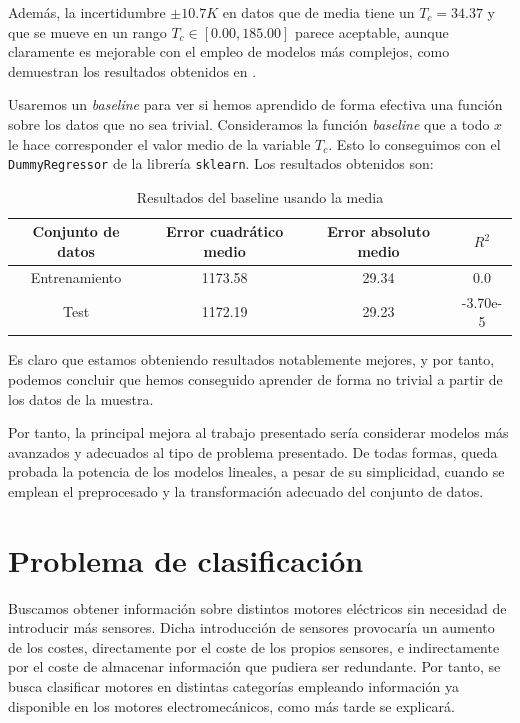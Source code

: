 \documentclass[11pt]{article}
\begin{document}
Además, la incertidumbre $\pm 10.7 K$ en datos que de media tiene un $T_c = 34.37$ y que se mueve en un rango $T_c \in [0.00, 185.00]$ parece aceptable, aunque claramente es mejorable con el empleo de modelos más complejos, como demuestran los resultados obtenidos en \cite{original_paper_reg:paper}.

Usaremos un \emph{baseline} para ver si hemos aprendido de forma efectiva una función sobre los datos que no sea trivial. Consideramos la función \emph{baseline} que a todo $x$ le hace corresponder el valor medio de la variable $T_c$. Esto lo conseguimos con el \lstinline{DummyRegressor} de la librería \lstinline{sklearn}. Los resultados obtenidos son:

\begin{table}[H]
\centering
\begin{tabular}{|c|c|c|c|}
    \hline
    \textbf{Conjunto de datos} & \textbf{Error cuadrático medio} & \textbf{Error absoluto medio} & \textbf{$R^2$} \\
    \hline
    Entrenamiento & 1173.58 & 29.34 &  0.0 \\
    Test & 1172.19 & 29.23 & -3.70e-5 \\
    \hline
\end{tabular}
    \caption{Resultados del baseline usando la media}
\end{table}

Es claro que estamos obteniendo resultados notablemente mejores, y por tanto, podemos concluir que hemos conseguido aprender de forma no trivial a partir de los datos de la muestra.

Por tanto, la principal mejora al trabajo presentado sería considerar modelos más avanzados y adecuados al tipo de problema presentado. De todas formas, queda probada la potencia de los modelos lineales, a pesar de su simplicidad, cuando se emplean el preprocesado y la transformación adecuado del conjunto de datos.

\pagebreak
\section{Problema de clasificación}

Buscamos obtener información sobre distintos motores eléctricos sin necesidad de introducir más sensores. Dicha introducción de sensores provocaría un aumento de los costes, directamente por el coste de los propios sensores, e indirectamente por el coste de almacenar información que pudiera ser redundante. Por tanto, se busca clasificar motores en distintas categorías empleando información ya disponible en los motores electromecánicos, como más tarde se explicará.
\end{document}
